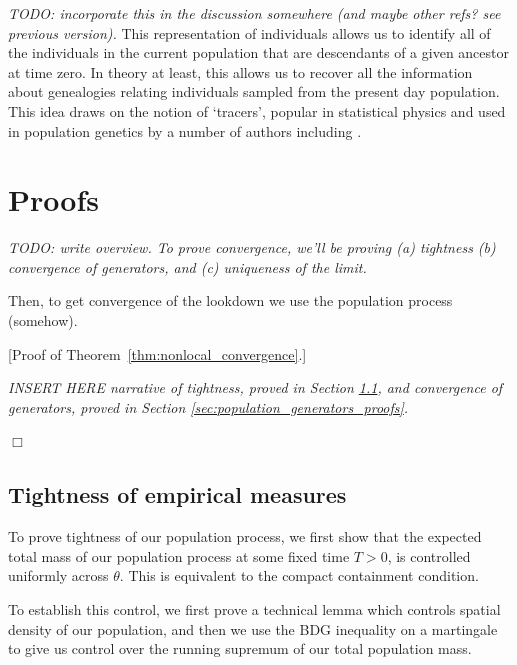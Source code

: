 \documentclass[12pt]{article}
\newenvironment {proof}{{\noindent\bf Proof }}{\hfill $\Box$ \medskip}
\newcommand{\comment}[1]{{\color{blue} \it #1}}
\begin{document}
\comment{TODO: incorporate this in the discussion somewhere (and maybe other refs? see previous version).}
This representation of individuals allows us to identify all 
of the individuals in the current population that are descendants of a
given ancestor at time zero. In theory at least, this allows us to
recover all the information about genealogies relating individuals 
sampled from the present day population. This idea draws on the notion
of `tracers', popular in statistical physics and used in population
genetics by a number of authors including 
\cite{biswas/etheridge/klimek:2018, durrett/fan:2016, hallatschek/nelson:2008}.





\section{Proofs}

\comment{
    TODO: write overview.
    To prove convergence, we'll be proving
    (a) tightness
    (b) convergence of generators, and
    (c) uniqueness of the limit.

    Then, to get convergence of the lookdown
    we use the population process (somehow).
}

\begin{proof}[Proof of Theorem~\ref{thm:nonlocal_convergence}.]

\comment{INSERT HERE
    narrative of tightness,
    proved in Section \ref{sec:population_tightness_proofs},
    and convergence of generators,
    proved in Section \ref{sec:population_generators_proofs}.
}

\end{proof}


\subsection{Tightness of empirical measures}
    \label{sec:population_tightness_proofs}
To prove tightness of our population process, 
we first show that the expected total mass of our population process at some fixed time $T>0$,
is controlled uniformly across $\theta$.
This is equivalent to the compact containment condition.

To establish this control,
we first prove a technical lemma which controls spatial density of our population,
and then we use the BDG inequality on a martingale
to give us control over the running supremum of our total population mass.
\end{document}

